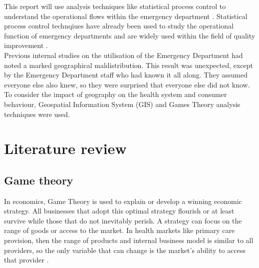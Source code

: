 \documentclass[11pt,a4paper]{article}
\begin{document}
This report will use analysis techniques like statistical process control to understand the operational flows within the emergency department \citep{rosemann2015six, cheng2015run, epprecht2015statistical}. Statistical process control technqiues have already been used to study the operational function of emergency departments \citep{pimentel2015statistical} and are widely used within the field of quality improvement \citep{provost2011health}.\\

Previous internal studies on the utilisation of the Emergency Department had noted a marked geographical maldistribution. This result was unexpected, except by the Emergency Department staff who had known it all along. They assumed everyone else also knew, so they were surprised that everyone else did not know. To consider the impact of geography on the health system and consumer behaviour, Geospatial Information System (GIS) and Games Theory analysis techniques were used.\\

\pagebreak
\section{Literature review}
\subsection{Game theory}
In economics, Game Theory is used to explain or develop a winning economic strategy. All businesses that adopt this optimal strategy flourish or at least survive while those that do not inevitably perish. A strategy can focus on the range of goods or access to the market. In health markets like primary care provision, then the range of products and internal business model is similar to all providers, so the  only variable that can change is the market's ability to access that provider \citep{dinar2008game}. \\
\end{document}
